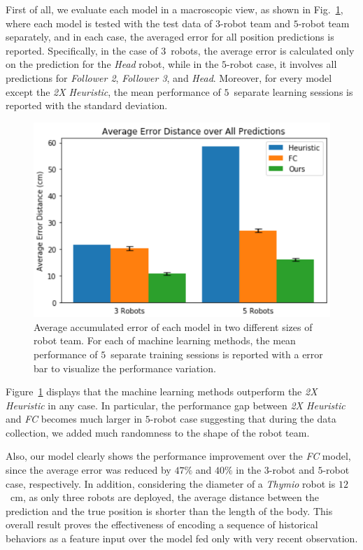 \documentclass[letterpaper, 10 pt, conference]{ieeeconf}  %
\begin{document}
    First of all, we evaluate each model in a macroscopic view, as shown
    in Fig.~\ref{fig:macro_eval}, where each model is tested with the
    test data of $3$-robot team and $5$-robot team separately, and in
    each case, the averaged error for all position predictions is
    reported. Specifically, in the case of $3$~robots, the average error
    is calculated only on the prediction for the \emph{Head} robot,
    while in the $5$-robot case, it involves all predictions for
    \emph{Follower 2}, \emph{Follower 3}, and \emph{Head}. Moreover, for
    every model except the \emph{2X Heuristic}, the mean performance of
    $5$~separate learning sessions is reported with the standard
    deviation.
	\begin{figure}[t]
        \centering
        \includegraphics[width=1.\columnwidth]{fig_macro_eval}
        \caption{Average accumulated error of each model in two different sizes of robot team.
            For each of machine learning methods, the mean performance of $5$~separate training
            sessions is reported with a error bar to visualize the performance variation.
        }
        \label{fig:macro_eval}
	\end{figure}

    Figure~\ref{fig:macro_eval} displays that the machine learning
    methods outperform the \emph{2X Heuristic} in any case. In
    particular, the performance gap between \emph{2X Heuristic} and
    \emph{FC} becomes much larger in $5$-robot case suggesting that
    during the data collection, we added much randomness to the shape of
    the robot team.

    Also, our model clearly shows the performance improvement over the
    \emph{FC} model, since the average error was reduced by $47\%$ and
    $40\%$ in the $3$-robot and $5$-robot case, respectively. In
    addition, considering the diameter of a \emph{Thymio} robot is
    $12$~cm, as only three robots are deployed, the average distance
    between the prediction and the true position is shorter than the
    length of the body. This overall result proves the effectiveness of
    encoding a sequence of historical behaviors as a feature input over
    the model fed only with very recent observation.
\end{document}
